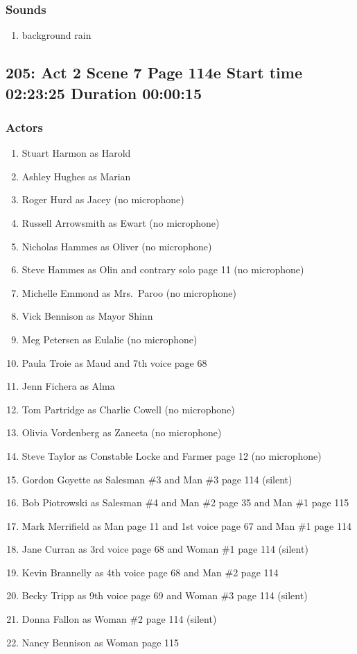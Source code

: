 \subsubsection{Sounds}
\begin{enumerate}
\item background rain
\end{enumerate}
\subsection{205: Act 2 Scene 7 Page 114e Start time 02:23:25 Duration 00:00:15}

\subsubsection{Actors}
\begin{enumerate}
\item Stuart Harmon as Harold
\item Ashley Hughes as Marian
\item Roger Hurd as Jacey (no microphone)
\item Russell Arrowsmith as Ewart (no microphone)
\item Nicholas Hammes as Oliver (no microphone)
\item Steve Hammes as Olin and contrary solo page 11 (no microphone)
\item Michelle Emmond as Mrs.~Paroo (no microphone)
\item Vick Bennison as Mayor Shinn
\item Meg Petersen as Eulalie (no microphone)
\item Paula Troie as Maud and 7th voice page 68
\item Jenn Fichera as Alma
\item Tom Partridge as Charlie Cowell (no microphone)
\item Olivia Vordenberg as Zaneeta (no microphone)
\item Steve Taylor as Constable Locke and Farmer page 12 (no microphone)
\item Gordon Goyette as Salesman \#3 and Man \#3 page 114 (silent)
\item Bob Piotrowski as Salesman \#4 and Man \#2 page 35 and Man \#1 page 115
\item Mark Merrifield as Man page 11 and 1st voice page 67 and Man \#1 page 114
\item Jane Curran as 3rd voice page 68 and Woman \#1 page 114 (silent)
\item Kevin Brannelly as 4th voice page 68 and Man \#2 page 114
\item Becky Tripp as 9th voice page 69 and Woman \#3 page 114 (silent)
\item Donna Fallon as Woman \#2 page 114 (silent)
\item Nancy Bennison as Woman page 115
\end{enumerate}

